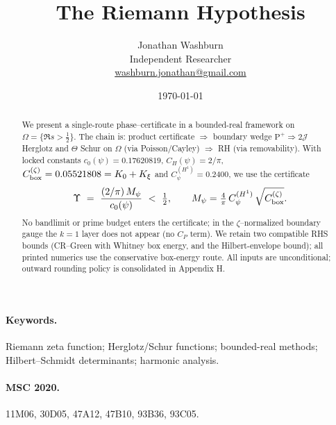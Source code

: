 \documentclass[11pt]{article}
\title{The Riemann Hypothesis}
\author{Jonathan Washburn\\ Independent Researcher\\ \href{mailto:washburn.jonathan@gmail.com}{washburn.jonathan@gmail.com}}
\date{\today}
\providecommand{\czeroplateau}{0.17620819}%
\providecommand{\CboxZeta}{0.05521808}%
\providecommand{\CHone}{2/\pi}%
\providecommand{\CpsiHone}{0.2400}%
\theoremstyle{definition}
\theoremstyle{remark}
\begin{document}
\maketitle

\begin{abstract}
We present a single-route phase–certificate in a bounded-real framework on \(\Omega=\{\Re s>\tfrac12\}\). The chain is: product certificate \(\Rightarrow\) boundary wedge \(\mathrm{P}^+\Rightarrow 2\mathcal J\) Herglotz and \(\Theta\) Schur on \(\Omega\) (via Poisson/Cayley) \(\Rightarrow\) RH (via removability). With locked constants \(c_0(\psi)=\czeroplateau\), \(C_H(\psi)=\CHone\), \(C_{\rm box}^{(\zeta)}=\CboxZeta=K_0+K_\xi\) and \(C_\psi^{(H^1)}=\CpsiHone\), we use the certificate
\[
\Upsilon\ =\ \frac{(2/\pi)\,M_\psi}{c_0(\psi)}\ <\ \tfrac{1}{2},\qquad M_\psi=\tfrac{4}{\pi}\,C_\psi^{(H^1)}\,\sqrt{C_{\rm box}^{(\zeta)}}.
\]
No bandlimit or prime budget enters the certificate; in the \(\zeta\)–normalized boundary gauge the \(k{=}1\) layer does not appear (no $C_P$ term). We retain two compatible RHS bounds (CR–Green with Whitney box energy, and the Hilbert-envelope bound); all printed numerics use the conservative box-energy route. All inputs are unconditional; outward rounding policy is consolidated in Appendix H.
\end{abstract}

\paragraph{Keywords.} Riemann zeta function; Herglotz/Schur functions; bounded-real methods; Hilbert--Schmidt determinants; harmonic analysis.

\paragraph{MSC 2020.} 11M06, 30D05, 47A12, 47B10, 93B36, 93C05.
\end{document}
